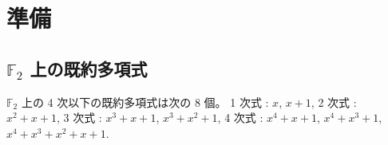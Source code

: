 
\section{準備}

\subsection{$\mathbb{F}_2$ 上の既約多項式}

\begin{proposition}
$\mathbb{F}_2$ 上の 4 次以下の既約多項式は次の 8 個。
1 次式 : $x$, $x+1$,
2 次式 : $x^2+x+1$,
3 次式 : $x^3+x+1$, $x^3+x^2+1$,
4 次式 : $x^4+x+1$, $x^4+x^3+1$, $x^4+x^3+x^2+x+1$.
\end{proposition}
